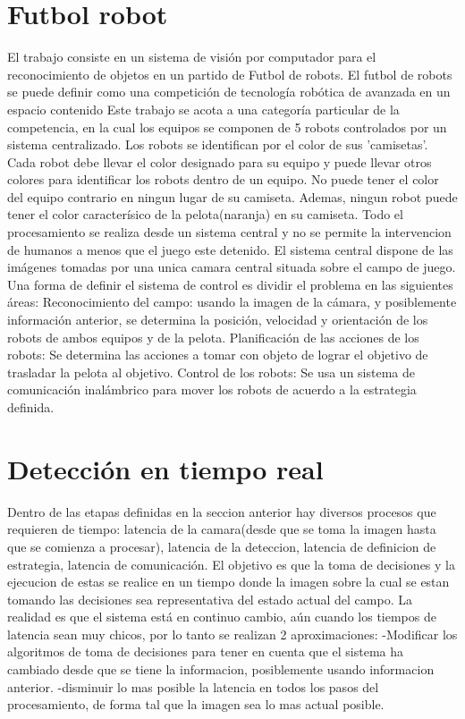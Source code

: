 \documentclass[a4paper,10pt]{report}
\begin{document}
\section{Futbol robot}
El trabajo consiste en un sistema de visión por computador para el reconocimiento de objetos en un partido de Futbol de robots.
El futbol de robots se puede definir como una competición de tecnología robótica de avanzada en un espacio contenido
Este trabajo se acota a una categoría particular de la competencia, en la cual los equipos se componen de 5 robots controlados por un sistema centralizado. 
Los robots se identifican por el color de sus 'camisetas'. Cada robot debe llevar el color designado para su equipo y puede llevar otros colores para identificar los robots dentro de un equipo.
No puede tener el color del equipo contrario en ningun lugar de su camiseta.
Ademas, ningun robot puede tener el color caracterísico de la pelota(naranja) en su camiseta.
Todo el procesamiento se realiza desde un sistema central y no se permite la intervencion de humanos a menos que el juego este detenido.
El sistema central dispone de las imágenes tomadas por una unica camara central situada sobre el campo de juego.
Una forma de definir el sistema de control es dividir el problema en las siguientes áreas:
Reconocimiento del campo: usando la imagen de la cámara, y posiblemente información anterior, se determina la posición, velocidad y orientación de los robots de ambos equipos y de la pelota.
Planificación de las acciones de los robots: Se determina las acciones a tomar con objeto de lograr el objetivo de trasladar la pelota al objetivo.
Control de los robots: Se usa un sistema de comunicación inalámbrico para mover los robots de acuerdo a la estrategia definida.


\section{Detección en tiempo real}
Dentro de las etapas definidas en la seccion anterior hay diversos procesos que requieren de tiempo: latencia de la camara(desde que se toma la imagen hasta que se comienza a procesar),
latencia de la deteccion, latencia de definicion de estrategia, latencia de comunicación.
El objetivo es que la toma de decisiones y la ejecucion de estas se realice en un tiempo donde la imagen sobre la cual se estan tomando las decisiones sea representativa del estado actual del campo.
La realidad es que el sistema está en continuo cambio, aún cuando los tiempos de latencia sean muy chicos, por lo tanto se realizan 2 aproximaciones: 
-Modificar los algoritmos de toma de decisiones para tener en cuenta que el sistema ha cambiado desde que se tiene la informacion, posiblemente usando informacion anterior.
-disminuir lo mas posible la latencia en todos los pasos del procesamiento, de forma tal que la imagen sea lo mas actual posible.
\end{document}
